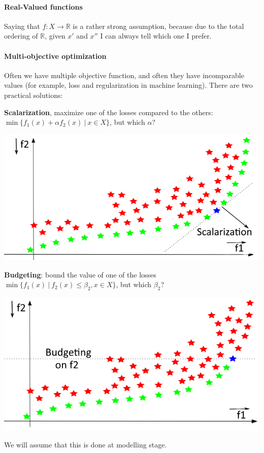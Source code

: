 \documentclass[10pt]{report}
\begin{document}
\paragraph{Real-Valued functions} Saying that $f : X \rightarrow \mathbb{R}$ is a rather strong assumption, because due to the total ordering of $\mathbb{R}$, given $x'$ and $x''$ I can always tell which one I prefer.
\paragraph{Multi-objective optimization} Often we have multiple objective function, and often they have incomparable values (for example, loss and regularization in machine learning). There are two practical solutions:
\begin{multicols}{2}
\textbf{Scalarization}, maximize one of the losses compared to the others: 	$\min\{f_1(x) + \alpha f_2(x)\:|\:x\in X\}$, but which $\alpha$?
\begin{center}
	\includegraphics[scale=0.33]{3.png}
\end{center}
\columnbreak
\textbf{Budgeting}: bound the value of one of the losses\\
	$\min\{f_1(x)\:|\:f_2(x)\leq \beta_2,x\in X\}$, but which $\beta_2$?
\begin{center}
	\includegraphics[scale=0.33]{4.png}
\end{center}
\end{multicols}
We will assume that this is done at modelling stage.
\end{document}
